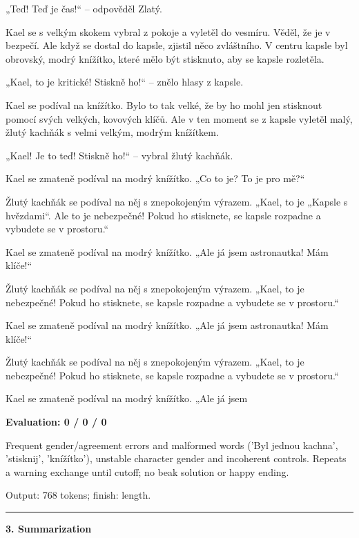 \documentclass[10pt]{article}
\begin{document}
{\begin{minipage}{\textwidth}
\par\smallskip
„Teď! Teď je čas!“ – odpověděl Zlatý.
\par\smallskip
Kael se s velkým skokem vybral z pokoje a vyletěl do vesmíru. Věděl, že je v bezpečí. Ale když se dostal do kapsle, zjistil něco zvláštního. V centru kapsle byl obrovský, modrý knížítko, které mělo být stisknuto, aby se kapsle rozletěla.
\par\smallskip
„Kael, to je kritické! Stiskně ho!“ – znělo hlasy z kapsle.
\par\smallskip
Kael se podíval na knížítko. Bylo to tak velké, že by ho mohl jen stisknout pomocí svých velkých, kovových klíčů. Ale v ten moment se z kapsle vyletěl malý, žlutý kachňák s velmi velkým, modrým knížítkem.
\par\smallskip
„Kael! Je to teď! Stiskně ho!“ – vybral žlutý kachňák.
\par\smallskip
Kael se zmateně podíval na modrý knížítko. „Co to je? To je pro mě?“
\par\smallskip
Žlutý kachňák se podíval na něj s znepokojeným výrazem. „Kael, to je „Kapsle s hvězdami“. Ale to je nebezpečné! Pokud ho stisknete, se kapsle rozpadne a vybudete se v prostoru.“
\par\smallskip
Kael se zmateně podíval na modrý knížítko. „Ale já jsem astronautka! Mám klíče!“
\par\smallskip
Žlutý kachňák se podíval na něj s znepokojeným výrazem. „Kael, to je nebezpečné! Pokud ho stisknete, se kapsle rozpadne a vybudete se v prostoru.“
\par\smallskip
Kael se zmateně podíval na modrý knížítko. „Ale já jsem astronautka! Mám klíče!“
\par\smallskip
Žlutý kachňák se podíval na něj s znepokojeným výrazem. „Kael, to je nebezpečné! Pokud ho stisknete, se kapsle rozpadne a vybudete se v prostoru.“
\par\smallskip
Kael se zmateně podíval na modrý knížítko. „Ale já jsem\par\smallskip
\textbf{Evaluation: 0 / 0 / 0}\par Frequent gender/agreement errors and malformed words ('Byl jednou kachna', 'stisknij', 'knížítko'), unstable character gender and incoherent controls. Repeats a warning exchange until cutoff; no beak solution or happy ending.
\par {\color{gray} Output: 768 tokens; finish: length.}\par
\medskip\hrule\smallskip
{\bfseries 3. Summarization}\par\smallskip

\end{minipage}}
\end{document}
